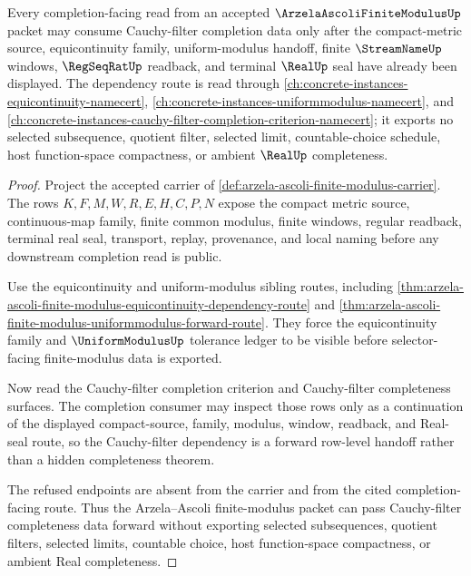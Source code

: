 \begin{theorem}
\label{thm:arzela-ascoli-finite-modulus-cauchy-filter-completeness-forward-route}
Every completion-facing read from an accepted $\ArzelaAscoliFiniteModulusUp$ packet may consume Cauchy-filter completion data only after the compact-metric source, equicontinuity family, uniform-modulus handoff, finite $\StreamNameUp$ windows, $\RegSeqRatUp$ readback, and terminal $\RealUp$ seal have already been displayed. The dependency route is read through \autoref{ch:concrete-instances-equicontinuity-namecert}, \autoref{ch:concrete-instances-uniformmodulus-namecert}, and \autoref{ch:concrete-instances-cauchy-filter-completion-criterion-namecert}; it exports no selected subsequence, quotient filter, selected limit, countable-choice schedule, host function-space compactness, or ambient $\RealUp$ completeness.
\end{theorem}
\begin{proof}
Project the accepted carrier of \autoref{def:arzela-ascoli-finite-modulus-carrier}. The rows $K,F,M,W,R,E,H,C,P,N$ expose the compact metric source, continuous-map family, finite common modulus, finite windows, regular readback, terminal real seal, transport, replay, provenance, and local naming before any downstream completion read is public.

Use the equicontinuity and uniform-modulus sibling routes, including \autoref{thm:arzela-ascoli-finite-modulus-equicontinuity-dependency-route} and \autoref{thm:arzela-ascoli-finite-modulus-uniformmodulus-forward-route}. They force the equicontinuity family and $\UniformModulusUp$ tolerance ledger to be visible before selector-facing finite-modulus data is exported.

Now read the Cauchy-filter completion criterion and Cauchy-filter completeness surfaces. The completion consumer may inspect those rows only as a continuation of the displayed compact-source, family, modulus, window, readback, and Real-seal route, so the Cauchy-filter dependency is a forward row-level handoff rather than a hidden completeness theorem.

The refused endpoints are absent from the carrier and from the cited completion-facing route. Thus the Arzela--Ascoli finite-modulus packet can pass Cauchy-filter completeness data forward without exporting selected subsequences, quotient filters, selected limits, countable choice, host function-space compactness, or ambient Real completeness.
\end{proof}
